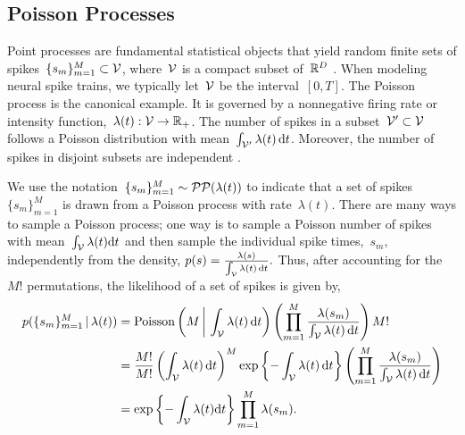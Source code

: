 \subsection{Poisson Processes}
\sloppy Point processes are fundamental statistical objects that yield
random finite sets of spikes~${\{s_m\}_{m=1}^M \subset \mathcal{V}}$,
where~$\mathcal{V}$ is a compact subset of~${\mathbb{R}^D}$
\citep{daley2003introduction1}.  When modeling neural spike trains, we
typically let~${\mathcal{V}}$ be the interval~${[0,T]}$. The Poisson process
is the canonical example. It is governed by a nonnegative firing rate
or intensity function,~${\lambda(t): \mathcal{V} \rightarrow\mathbb{R}_+}$. The
number of spikes in a subset~${\mathcal{V}'\subset\mathcal{V}}$ follows a Poisson
distribution with mean~${\int_{\mathcal{V}'}\lambda(t) \,
  \mathrm{d}t}$. Moreover, the number of spikes in disjoint subsets
are independent \citep{Kingman-1993}.

We use the notation~${\{s_m\}_{m=1}^M\sim\mathcal{PP}(\lambda(t))}$ to indicate
that a set of spikes~$\{s_m\}_{m=1}^M$ is drawn from a Poisson process
with rate~$\lambda(t)$. There are many ways to sample a Poisson
process; one way is to sample a Poisson number of spikes with
mean~${\int_{\mathcal{V}} \lambda(t) \mathrm{d}t}$ and then sample the individual
spike times,~$s_m$, independently from the density,
${
  p(s) = \frac{\lambda(s)}{\int_{\mathcal{V}} \lambda(t) \, \mathrm{d}t}.
}$
Thus, after accounting for the~$M!$ permutations,
the likelihood of a set of spikes is given by,
\begin{align}
  \nonumber
  p(\{s_m\}_{m=1}^M \,|\, \lambda(t))
  &= \mathrm{Poisson} \left(M \, \bigg| \, \int_{\mathcal{V}} \lambda(t) \, \mathrm{d} t \right)
  \left( \prod_{m=1}^M \frac{\lambda(s_m)}{\int_{\mathcal{V}} \lambda(t) \, \mathrm{d}t} \right)  M! \\
  \nonumber
  &= \frac{M!}{M!} \left(\int_{\mathcal{V}} \lambda(t) \, \mathrm{d} t \right)^M
  \exp \left \{-\int_{\mathcal{V}} \lambda(t) \, \mathrm{d} t \right \} 
  \left( \prod_{m=1}^M \frac{\lambda(s_m)}{\int_{\mathcal{V}} \lambda(t) \, \mathrm{d}t} \right) \\
  \label{eq:poisson_lkhd}
  &=\exp\left\{-\int_{\mathcal{V}}\lambda(t)\mathrm{d}t \right\}
  \prod_{m=1}^M\lambda(s_m).
\end{align}

